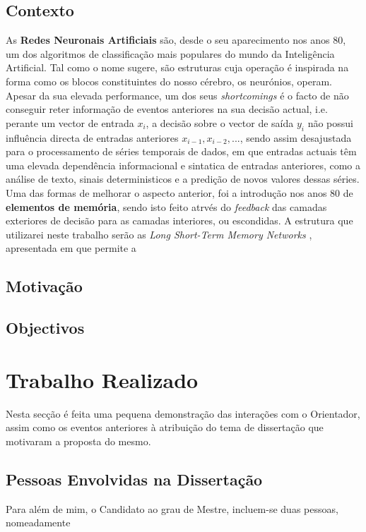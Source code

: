 \documentclass[a4paper, onecolumn, 10pt]{article}
\begin{document}
	\subsection{Contexto}
	As \textbf{Redes Neuronais Artificiais} são, desde o seu aparecimento nos anos 80, um dos algoritmos de classificação mais populares do mundo da Inteligência Artificial. Tal como o nome sugere, são estruturas cuja operação é inspirada na forma como os blocos constituintes do nosso cérebro, os neurónios, operam. Apesar da sua elevada performance, um dos seus \textit{shortcomings} é o facto de não conseguir reter informação de eventos anteriores na sua decisão actual, i.e. perante um vector de entrada $x_i$, a decisão sobre o vector de saída $y_i$ não possui influência directa de entradas anteriores $x_{i-1}, x_{i-2}, ...$, sendo assim desajustada para o processamento de séries temporais de dados, em que entradas actuais têm uma elevada dependência informacional e sintatica de entradas anteriores, como a análise de texto, sinais deterministicos e a predição de novos valores dessas séries.
	Uma das formas de melhorar o aspecto anterior, foi a introdução nos anos 80 de \textbf{elementos de memória}, sendo isto feito atrvés do \textit{feedback} das camadas exteriores de decisão para as camadas interiores, ou escondidas. A estrutura que utilizarei neste trabalho serão as \textit{Long Short-Term Memory Networks} \cite{hochreiter-lstm}, apresentada em que permite a  

	\subsection{Motivação}

	\subsection{Objectivos}


\section{Trabalho Realizado}
Nesta secção é feita uma pequena demonstração das interações com o Orientador, assim como os eventos anteriores à atribuição do tema de dissertação que motivaram a proposta do mesmo.

	\subsection{Pessoas Envolvidas na Dissertação}
	Para além de mim, o Candidato ao grau de Mestre, incluem-se duas pessoas, nomeadamente
\end{document}

